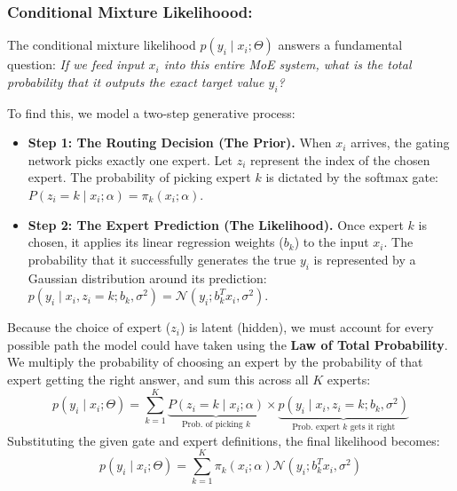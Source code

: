 \documentclass[twoside, 10pt]{article}
\begin{document}
\subsubsection{Conditional Mixture Likelihoood:}
The conditional mixture likelihood $p(y_i \mid x_i; \Theta)$ answers a fundamental question: \textit{If we feed input $x_i$ into this entire MoE system, what is the total probability that it outputs the exact target value $y_i$?} 

To find this, we model a two-step generative process:
\begin{itemize}
    \item \textbf{Step 1: The Routing Decision (The Prior).} When $x_i$ arrives, the gating network picks exactly one expert. Let $z_i$ represent the index of the chosen expert. The probability of picking expert $k$ is dictated by the softmax gate: $P(z_i = k \mid x_i; \alpha) = \pi_k(x_i; \alpha)$.
    \item \textbf{Step 2: The Expert Prediction (The Likelihood).} Once expert $k$ is chosen, it applies its linear regression weights ($b_k$) to the input $x_i$. The probability that it successfully generates the true $y_i$ is represented by a Gaussian distribution around its prediction: $p(y_i \mid x_i, z_i = k; b_k, \sigma^2) = \mathcal{N}(y_i; b_k^T x_i, \sigma^2)$.
\end{itemize}

Because the choice of expert ($z_i$) is latent (hidden), we must account for every possible path the model could have taken using the \textbf{Law of Total Probability}. We multiply the probability of choosing an expert by the probability of that expert getting the right answer, and sum this across all $K$ experts:
\[
p(y_i \mid x_i; \Theta) = \sum_{k=1}^K \underbrace{P(z_i = k \mid x_i; \alpha)}_{\text{Prob. of picking } k} \times \underbrace{p(y_i \mid x_i, z_i = k; b_k, \sigma^2)}_{\text{Prob. expert } k \text{ gets it right}}
\]
Substituting the given gate and expert definitions, the final likelihood becomes:
\[
p(y_i \mid x_i; \Theta) = \sum_{k=1}^K \pi_k(x_i; \alpha) \mathcal{N}(y_i; b_k^T x_i, \sigma^2)
\]
\end{document}
